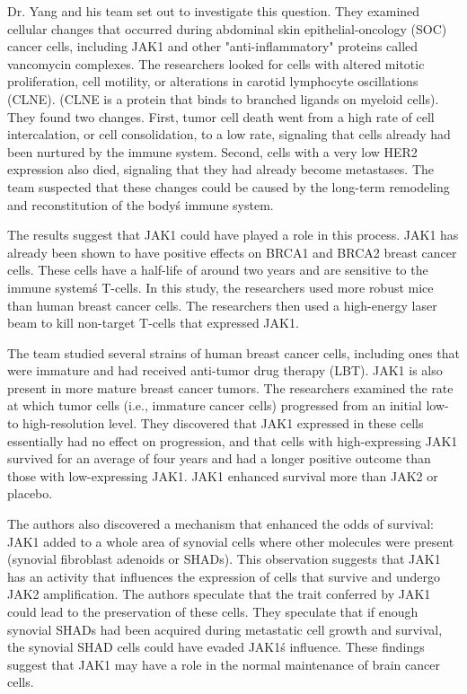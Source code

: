 \documentclass{article}
\begin{document}
Dr. Yang and his team set out to investigate this question. They examined cellular changes that occurred during abdominal skin epithelial-oncology (SOC) cancer cells, including JAK1 and other "anti-inflammatory" proteins called vancomycin complexes. The researchers looked for cells with altered mitotic proliferation, cell motility, or alterations in carotid lymphocyte oscillations (CLNE). (CLNE is a protein that binds to branched ligands on myeloid cells). They found two changes. First, tumor cell death went from a high rate of cell intercalation, or cell consolidation, to a low rate, signaling that cells already had been nurtured by the immune system. Second, cells with a very low HER2 expression also died, signaling that they had already become metastases. The team suspected that these changes could be caused by the long-term remodeling and reconstitution of the body\'s immune system.

The results suggest that JAK1 could have played a role in this process. JAK1 has already been shown to have positive effects on BRCA1 and BRCA2 breast cancer cells. These cells have a half-life of around two years and are sensitive to the immune system\'s T-cells. In this study, the researchers used more robust mice than human breast cancer cells. The researchers then used a high-energy laser beam to kill non-target T-cells that expressed JAK1.

The team studied several strains of human breast cancer cells, including ones that were immature and had received anti-tumor drug therapy (LBT). JAK1 is also present in more mature breast cancer tumors. The researchers examined the rate at which tumor cells (i.e., immature cancer cells) progressed from an initial low- to high-resolution level. They discovered that JAK1 expressed in these cells essentially had no effect on progression, and that cells with high-expressing JAK1 survived for an average of four years and had a longer positive outcome than those with low-expressing JAK1. JAK1 enhanced survival more than JAK2 or placebo.

The authors also discovered a mechanism that enhanced the odds of survival: JAK1 added to a whole area of synovial cells where other molecules were present (synovial fibroblast adenoids or SHADs). This observation suggests that JAK1 has an activity that influences the expression of cells that survive and undergo JAK2 amplification. The authors speculate that the trait conferred by JAK1 could lead to the preservation of these cells. They speculate that if enough synovial SHADs had been acquired during metastatic cell growth and survival, the synovial SHAD cells could have evaded JAK1\'s influence. These findings suggest that JAK1 may have a role in the normal maintenance of brain cancer cells.
\end{document}
